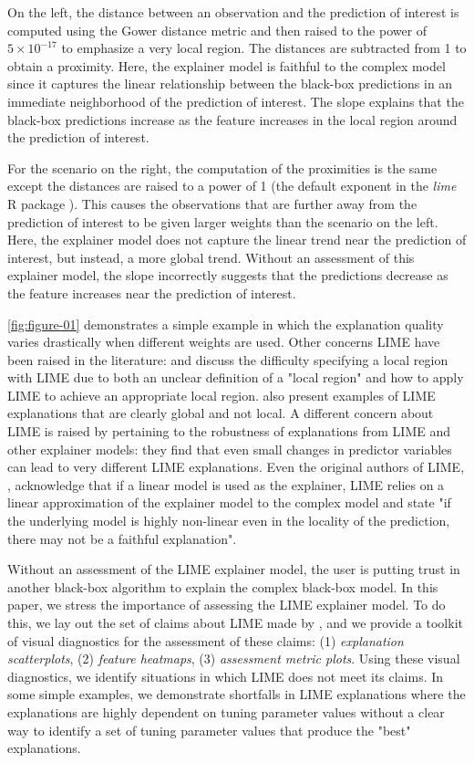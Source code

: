 \documentclass[AMS,STIX2COL]{WileyNJD-v2}\usepackage[]{graphicx}\usepackage[]{color}
\begin{document}
On the left, the distance between an observation and the prediction of interest is computed using the Gower distance metric \citep{gower:1971} and then raised to the power of \ensuremath{5\times 10^{-17}} to emphasize a very local region. The distances are subtracted from 1 to obtain a proximity. Here, the explainer model is faithful to the complex model since it captures the linear relationship between the black-box predictions in an immediate neighborhood of the prediction of interest. The slope explains that the black-box predictions increase as the feature increases in the local region around the prediction of interest.

For the scenario on the right, the computation of the proximities is the same except the distances are raised to a power of 1 (the default exponent in the \emph{lime} R package \citep{pedersen:2020}). This causes the observations that are further away from the prediction of interest to be given larger weights than the scenario on the left. Here, the explainer model does not capture the linear trend near the prediction of interest, but instead,  a more global trend. Without an assessment of this explainer model, the slope incorrectly suggests that the predictions decrease as the feature increases near the prediction of interest.

\autoref{fig:figure-01} demonstrates a simple example in which the explanation quality varies drastically when different weights are used. Other concerns  LIME have been raised in the literature: \citet{laugel:2018} and \citet{molnar:2019} discuss the difficulty specifying a local region with LIME due to both an unclear definition of  a "local region" and how to apply LIME to achieve an appropriate local region. \citet{laugel:2018} also present examples of LIME explanations that are clearly global and not local. A different concern about LIME is raised by \citet{alvarezmelis:2018} pertaining to the robustness of explanations from LIME and other explainer models: they find that even small changes in predictor variables can lead to very different LIME explanations. Even the original authors of LIME, \citet{ribeiro:2016}, acknowledge that if a linear model is used as the explainer, LIME relies on a linear approximation of the explainer model to the complex model and state "if the underlying model is highly non-linear even in the locality of the prediction, there may not be a faithful explanation".


Without an assessment of the LIME explainer model, the user is putting trust in another black-box algorithm to explain the complex black-box model. In this paper, we stress the importance of assessing the LIME explainer model. To do this, we lay out the set of claims about LIME made by \citet{ribeiro:2016}, and we provide a toolkit of visual diagnostics  for the assessment of these claims: (1) \emph{explanation scatterplots}, (2) \emph{feature heatmaps}, (3) \emph{assessment metric plots}. Using these visual diagnostics, we identify situations in which LIME does not meet its claims. In some simple examples, we  demonstrate shortfalls in LIME explanations where the explanations are highly dependent on tuning parameter values without a clear way to identify a set of tuning parameter values that produce the "best" explanations.
\end{document}

